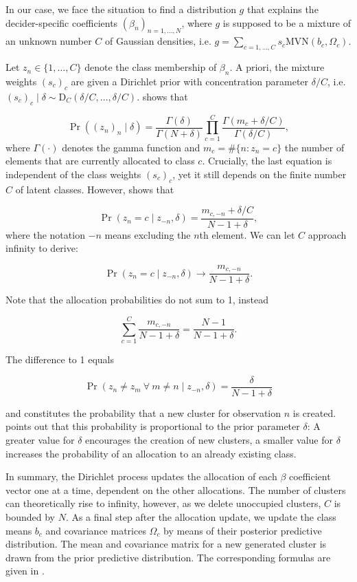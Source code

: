 \documentclass[article]{jss}
\begin{document}
In our case, we face the situation to find a distribution $g$ that explains the decider-specific coefficients $(\beta_n)_{n = 1,\dots,N}$, where $g$ is supposed to be a mixture of an unknown number $C$ of Gaussian densities, i.e. $g = \sum_{c = 1,\dots,C} s_c \text{MVN}(b_c, \Omega_c)$.

Let $z_n \in \{1,\dots,C\}$ denote the class membership of $\beta_n$. A priori, the mixture weights $(s_c)_c$ are given a Dirichlet prior with concentration parameter $\delta/C$, i.e. $(s_c)_c \mid \delta \sim \text{D}_C(\delta/C,\dots,\delta/C)$. \cite{Rasmussen:2000} shows that

$$ \Pr((z_n)_n\mid \delta) = \frac{\Gamma(\delta)}{\Gamma(N+\delta)} \prod_{c=1}^C \frac{\Gamma(m_c + \delta/C)}{\Gamma(\delta/C)}, $$
where $\Gamma(\cdot)$ denotes the gamma function and $m_c = \#\{n:z_n = c\}$ the number of elements that are currently allocated to class $c$. Crucially, the last equation is independent of the class weights $(s_c)_c$, yet it still depends on the finite number $C$ of latent classes. However, \cite{Li:2019} shows that

$$ \Pr(z_n = c \mid z_{-n}, \delta) = \frac{m_{c,-n} + \delta/C}{N-1+\delta},$$
where the notation $-n$ means excluding the $n$th element. We can let $C$ approach infinity to derive:

$$ \Pr(z_n = c \mid z_{-n}, \delta) \to \frac{m_{c,-n}}{N-1+\delta}. $$

Note that the allocation probabilities do not sum to 1, instead

$$ \sum_{c = 1}^C \frac{m_{c,-n}}{N-1+\delta} = \frac{N-1}{N-1+\delta}. $$

The difference to 1 equals

$$ \Pr(z_n \neq z_m ~ \forall ~ m \neq n \mid z_{-n}, \delta) = \frac{\delta}{N-1+\delta} $$

and constitutes the probability that a new cluster for observation $n$ is created. \cite{Neal:2000} points out that this probability is proportional to the prior parameter $\delta$: A greater value for $\delta$ encourages the creation of new clusters, a smaller value for $\delta$ increases the probability of an allocation to an already existing class.

In summary, the Dirichlet process updates the allocation of each $\beta$ coefficient vector one at a time, dependent on the other allocations. The number of clusters can theoretically rise to infinity, however, as we delete unoccupied clusters, $C$ is bounded by $N$. As a final step after the allocation update, we update the class means $b_c$ and covariance matrices $\Omega_c$ by means of their posterior predictive distribution. The mean and covariance matrix for a new generated cluster is drawn from the prior predictive distribution. The corresponding formulas are given in \cite{Li:2019}.
\end{document}

